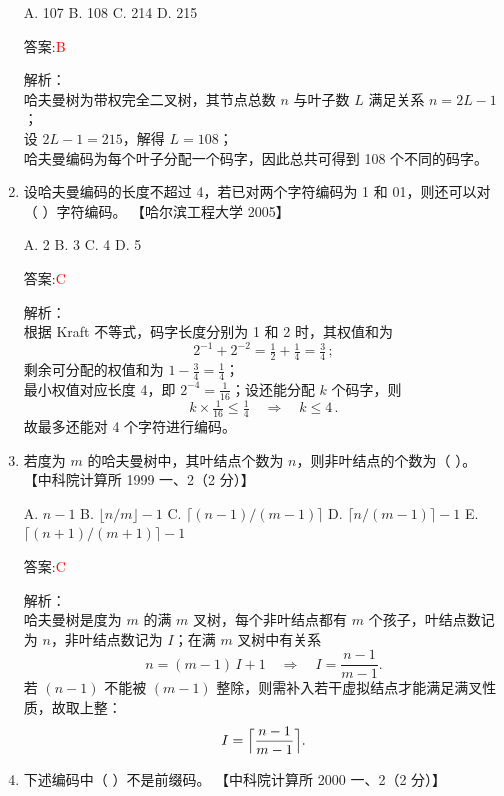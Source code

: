 \documentclass[lang=cn,newtx,10pt,scheme=chinese]{../../../elegantbook}
\begin{document}
\begin{enumerate}
    A. 107  
    B. 108  
    C. 214  
    D. 215

    答案:\textcolor{red}{B}

    解析：\\
    哈夫曼树为带权完全二叉树，其节点总数 $n$ 与叶子数 $L$ 满足关系 $n = 2L - 1$；\\
    设 $2L - 1 = 215$，解得 $L = 108$；\\
    哈夫曼编码为每个叶子分配一个码字，因此总共可得到 108 个不同的码字。\\

\item 设哈夫曼编码的长度不超过 4，若已对两个字符编码为 1 和 01，则还可以对（ ）字符编码。  
    【哈尔滨工程大学 2005】

    A. 2  
    B. 3  
    C. 4  
    D. 5

    答案:\textcolor{red}{C}

    解析：\\
    根据 Kraft 不等式，码字长度分别为 1 和 2 时，其权值和为  
    \[
      2^{-1} + 2^{-2} = \tfrac{1}{2} + \tfrac{1}{4} = \tfrac{3}{4}\,;
    \]  
    剩余可分配的权值和为 $1 - \tfrac{3}{4} = \tfrac{1}{4}$；\\
    最小权值对应长度 4，即 $2^{-4} = \tfrac{1}{16}$；设还能分配 $k$ 个码字，则  
    \[
      k \times \tfrac{1}{16} \le \tfrac{1}{4}
      \quad\Longrightarrow\quad
      k \le 4\,.
    \]  
    故最多还能对 4 个字符进行编码。\\
 

    \item 若度为 $m$ 的哈夫曼树中，其叶结点个数为 $n$，则非叶结点的个数为（ ）。  
    【中科院计算所 1999 一、2（2 分）】

    A. $n - 1$  
    B. $\lfloor n / m \rfloor - 1$  
    C. $\lceil (n - 1) / (m - 1) \rceil$  
    D. $\lceil n / (m - 1) \rceil - 1$  
    E. $\lceil (n + 1)/(m + 1)\rceil - 1$

    答案:\textcolor{red}{C}

    解析：\\
    哈夫曼树是度为 $m$ 的满 $m$ 叉树，每个非叶结点都有 $m$ 个孩子，叶结点数记为 $n$，非叶结点数记为 $I$；在满 $m$ 叉树中有关系  
    \[
      n = (m - 1)\,I + 1
      \quad\Longrightarrow\quad
      I = \frac{n - 1}{m - 1}.
    \]
    若 $(n - 1)$ 不能被 $(m - 1)$ 整除，则需补入若干虚拟结点才能满足满叉性质，故取上整：
    \[
      I = \Bigl\lceil \frac{n - 1}{m - 1} \Bigr\rceil.
    \]

\item 下述编码中（  ）不是前缀码。  
    【中科院计算所 2000 一、2（2 分）】


\end{enumerate}
\end{document}
